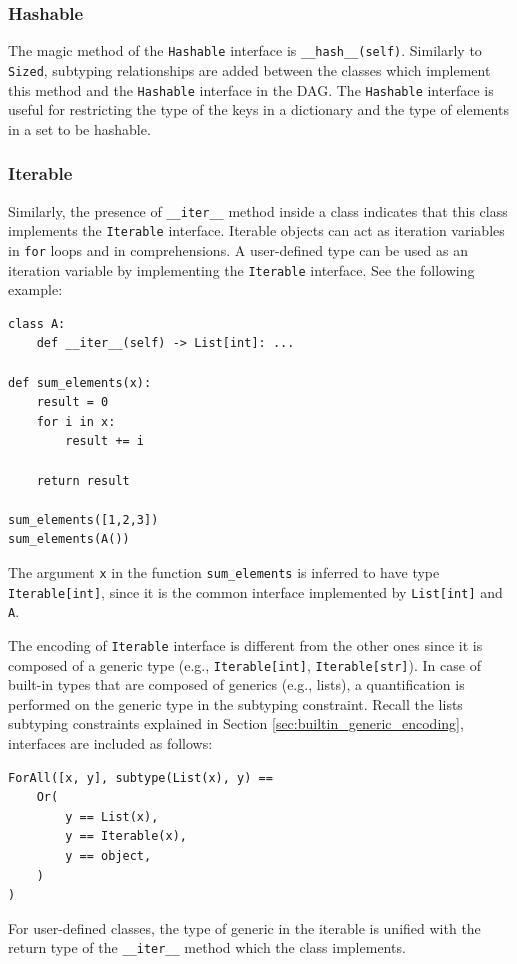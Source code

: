 \subsubsection{Hashable}
The magic method of the \lstinline|Hashable| interface is \lstinline|__hash__(self)|. Similarly to \lstinline|Sized|, subtyping relationships are added between the classes which implement this method and the \lstinline|Hashable| interface in the DAG. The \lstinline|Hashable| interface is useful for restricting the type of the keys in a dictionary and the type of elements in a set to be hashable.

\subsubsection{Iterable}
Similarly, the presence of \lstinline|__iter__| method inside a class indicates that this class implements the \lstinline|Iterable| interface. Iterable objects can act as iteration variables in \lstinline|for| loops and in comprehensions. A user-defined type can be used as an iteration variable by implementing the \lstinline|Iterable| interface. See the following example:
\begin{lstlisting}
class A:
	def __iter__(self) -> List[int]: ...

def sum_elements(x):
	result = 0
	for i in x:
		result += i
	
	return result
	
sum_elements([1,2,3])
sum_elements(A())
\end{lstlisting}
The argument \lstinline|x| in the function \lstinline|sum_elements| is inferred to have type \lstinline|Iterable[int]|, since it is the common interface implemented by \lstinline|List[int]| and \lstinline|A|.

The encoding of \lstinline|Iterable| interface is different from the other ones since it is composed of a generic type (e.g., \lstinline|Iterable[int]|, \lstinline|Iterable[str]|). In case of built-in types that are composed of generics (e.g., lists), a quantification is performed on the generic type in the subtyping constraint. Recall the lists subtyping constraints explained in Section \ref{sec:builtin_generic_encoding}, interfaces are included as follows:
\begin{lstlisting}
ForAll([x, y], subtype(List(x), y) ==
	Or(
		y == List(x),
		y == Iterable(x),
		y == object,
	)
)
\end{lstlisting}
For user-defined classes, the type of generic in the iterable is unified with the return type of the \lstinline|__iter__| method which the class implements.


